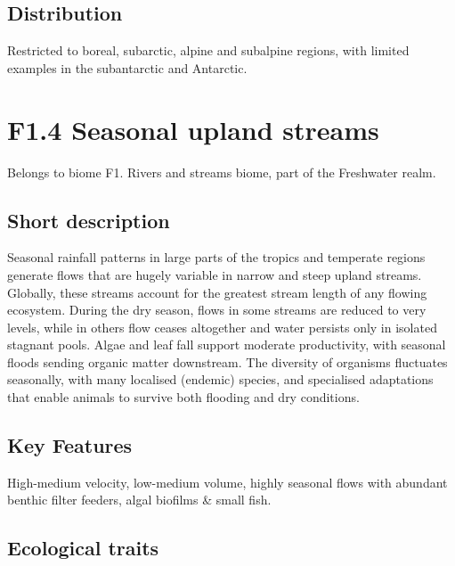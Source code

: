 \documentclass[
  letterpaper,
  DIV=11,
  numbers=noendperiod]{scrartcl}
\begin{document}
\subsection{Distribution}\label{distribution-111}

Restricted to boreal, subarctic, alpine and subalpine regions, with
limited examples in the subantarctic and Antarctic.

\section{F1.4 Seasonal upland
streams}\label{f1.4-seasonal-upland-streams-1}

Belongs to biome F1. Rivers and streams biome, part of the Freshwater
realm.

\subsection{Short description}\label{short-description-112}

Seasonal rainfall patterns in large parts of the tropics and temperate
regions generate flows that are hugely variable in narrow and steep
upland streams. Globally, these streams account for the greatest stream
length of any flowing ecosystem. During the dry season, flows in some
streams are reduced to very levels, while in others flow ceases
altogether and water persists only in isolated stagnant pools. Algae and
leaf fall support moderate productivity, with seasonal floods sending
organic matter downstream. The diversity of organisms fluctuates
seasonally, with many localised (endemic) species, and specialised
adaptations that enable animals to survive both flooding and dry
conditions.

\subsection{Key Features}\label{key-features-112}

High-medium velocity, low-medium volume, highly seasonal flows with
abundant benthic filter feeders, algal biofilms \& small fish.

\subsection{Ecological traits}\label{ecological-traits-112}
\end{document}
